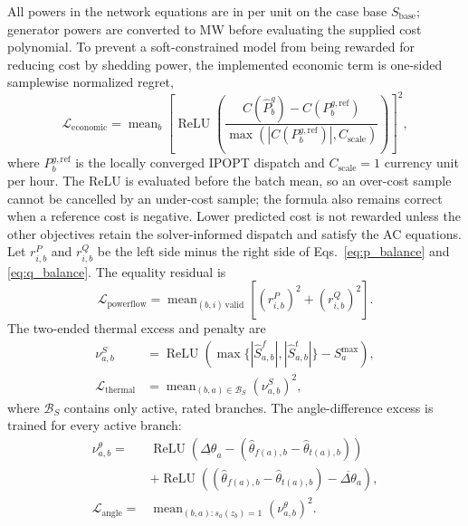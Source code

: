 \documentclass[final,5p,times,twocolumn]{elsarticle}
\newcommand{\relu}{\operatorname{ReLU}}
\newcommand{\mean}{\operatorname{mean}}
\begin{document}
All powers in the network equations are in per unit on the case base
$S_{\mathrm{base}}$; generator powers are converted to MW before evaluating
the supplied cost polynomial. To prevent a soft-constrained model from being
rewarded for reducing cost by shedding power, the implemented economic term is
one-sided samplewise normalized regret,
\begin{equation}
  \mathcal{L}_{\mathrm{economic}}
  =
  \mean_b
  \left[
  \relu\left(
  \frac{C(\widehat P_b^g)-C(P_b^{g,\mathrm{ref}})}
       {\max(|C(P_b^{g,\mathrm{ref}})|,C_{\mathrm{scale}})}
  \right)
  \right]^2,
  \label{eq:loss_cost}
\end{equation}
where $P_b^{g,\mathrm{ref}}$ is the locally converged IPOPT dispatch and
$C_{\mathrm{scale}}=1$ currency unit per hour. The ReLU is evaluated before
the batch mean, so an over-cost sample cannot be cancelled by an under-cost
sample; the formula also remains correct when a reference cost is negative.
Lower predicted cost is not rewarded unless the other objectives retain the
solver-informed dispatch and satisfy the AC equations.
Let $r_{i,b}^P$ and $r_{i,b}^Q$ be the left side minus the right side of
Eqs.~\eqref{eq:p_balance} and \eqref{eq:q_balance}. The equality residual is
\begin{equation}
  \mathcal{L}_{\mathrm{powerflow}}
  =
  \mean_{(b,i)\,\mathrm{valid}}
  \left[
    (r_{i,b}^P)^2+(r_{i,b}^Q)^2
  \right].
  \label{eq:loss_pf}
\end{equation}
The two-ended thermal excess and penalty are
\begin{align}
  \nu_{a,b}^{S}
  &=
  \relu\left(
    \max\{|\widehat S_{a,b}^f|,
           |\widehat S_{a,b}^t|\}
    -S_{a}^{\max}
  \right),
  \nonumber\\
  \mathcal{L}_{\mathrm{thermal}}
  &=
  \mean_{(b,a)\in\mathcal{B}_{S}}
  (\nu_{a,b}^{S})^2,
  \label{eq:loss_thermal}
\end{align}
where $\mathcal{B}_{S}$ contains only active, rated branches. The
angle-difference excess is trained for every active branch:
\begin{align}
  \nu_{a,b}^{\theta}
  ={}&
  \relu\left(
    \underline{\Delta\theta}_a
    -(\widehat\theta_{f(a),b}-\widehat\theta_{t(a),b})
  \right)
  \nonumber\\
  &+
  \relu\left(
    (\widehat\theta_{f(a),b}-\widehat\theta_{t(a),b})
    -\overline{\Delta\theta}_a
  \right),
  \nonumber\\
  \mathcal{L}_{\mathrm{angle}}
  ={}&
  \mean_{(b,a):s_a(z_b)=1}
  (\nu_{a,b}^{\theta})^2.
  \label{eq:loss_angle}
\end{align}
\end{document}
